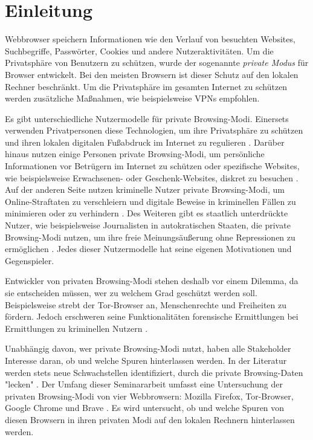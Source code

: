 \chapter{Einleitung}
Webbrowser speichern Informationen wie den Verlauf von besuchten Websites, Suchbegriffe, Passwörter, Cookies und andere Nutzeraktivitäten. 
Um die Privatsphäre von Benutzern zu schützen, wurde der sogenannte \textit{private Modus} für Browser entwickelt.
Bei den meisten Browsern ist dieser Schutz auf den lokalen Rechner beschränkt. \cite{Rochmadi.2017} Um die Privatsphäre im gesamten Internet zu schützen werden zusätzliche Maßnahmen, wie beispielsweise VPNs empfohlen. \cite{Perdices.2023}

Es gibt unterschiedliche Nutzermodelle für private Browsing-Modi. Einersets verwenden Privatpersonen diese Technologien, um ihre Privatsphäre zu schützen und ihren lokalen digitalen Fußabdruck im Internet zu regulieren \cite{Horsman.2019}. Darüber hinaus nutzen einige Personen private Browsing-Modi, um persönliche Informationen vor Betrügern im Internet zu schützen oder spezifische Websites, wie beispielsweise Erwachsenen- oder Geschenk-Websites, diskret zu besuchen \cite{Aggarwal.2010}. Auf der anderen Seite nutzen kriminelle Nutzer private Browsing-Modi, um Online-Straftaten zu verschleiern und digitale Beweise in kriminellen Fällen zu minimieren oder zu verhindern \cite{Montasari.2015, Rochmadi.2017}. Des Weiteren gibt es staatlich unterdrückte Nutzer, wie beispielsweise Journalisten in autokratischen Staaten, die private Browsing-Modi nutzen, um ihre freie Meinungsäußerung ohne Repressionen zu ermöglichen \cite{Rathod.2017}. Jedes dieser Nutzermodelle hat seine eigenen Motivationen und Gegenspieler.

Entwickler von privaten Browsing-Modi stehen deshalb vor einem Dilemma, da sie entscheiden müssen, wer zu welchem Grad geschützt werden soll. Beispielsweise strebt der Tor-Browser an, Menschenrechte und Freiheiten zu fördern. %
Jedoch erschweren seine Funktionalitäten forensische Ermittlungen bei Ermittlungen zu kriminellen Nutzern \cite{Muir.2019, Rathod.2017}.

Unabhängig davon, wer private Browsing-Modi nutzt, haben alle Stakeholder Interesse daran, ob und welche Spuren hinterlassen werden. In der Literatur werden stets neue Schwachstellen identifiziert, durch die private Browsing-Daten "lecken" \cite{Satvat.2014}.
Der Umfang dieser Seminararbeit umfasst eine Untersuchung der privaten Browsing-Modi von vier Webbrowsern: Mozilla Firefox, Tor-Browser, Google Chrome und Brave \cite{Montasari.2015}. Es wird untersucht, ob und welche Spuren von diesen Browsern in ihren privaten Modi auf den lokalen Rechnern hinterlassen werden.

